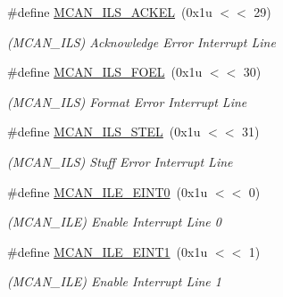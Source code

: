 \begin{DoxyCompactItemize}
\mbox{\label{group__SAME70__MCAN_gacbc1d7720db5dbf6b5d8d7e0f2c975e2}} 
\#define \mbox{\hyperlink{group__SAME70__MCAN_gacbc1d7720db5dbf6b5d8d7e0f2c975e2}{M\+C\+A\+N\+\_\+\+I\+L\+S\+\_\+\+A\+C\+K\+EL}}~(0x1u $<$$<$ 29)
\begin{DoxyCompactList}\small\item\em (M\+C\+A\+N\+\_\+\+I\+LS) Acknowledge Error Interrupt Line \end{DoxyCompactList}\item 
\mbox{\label{group__SAME70__MCAN_ga2ea2130ed2bdb49025f5abcfd2cfa0f0}} 
\#define \mbox{\hyperlink{group__SAME70__MCAN_ga2ea2130ed2bdb49025f5abcfd2cfa0f0}{M\+C\+A\+N\+\_\+\+I\+L\+S\+\_\+\+F\+O\+EL}}~(0x1u $<$$<$ 30)
\begin{DoxyCompactList}\small\item\em (M\+C\+A\+N\+\_\+\+I\+LS) Format Error Interrupt Line \end{DoxyCompactList}\item 
\mbox{\label{group__SAME70__MCAN_ga5734d837234608fcc26e446041609edf}} 
\#define \mbox{\hyperlink{group__SAME70__MCAN_ga5734d837234608fcc26e446041609edf}{M\+C\+A\+N\+\_\+\+I\+L\+S\+\_\+\+S\+T\+EL}}~(0x1u $<$$<$ 31)
\begin{DoxyCompactList}\small\item\em (M\+C\+A\+N\+\_\+\+I\+LS) Stuff Error Interrupt Line \end{DoxyCompactList}\item 
\mbox{\label{group__SAME70__MCAN_ga5195907fff902239550ce690f6e1093f}} 
\#define \mbox{\hyperlink{group__SAME70__MCAN_ga5195907fff902239550ce690f6e1093f}{M\+C\+A\+N\+\_\+\+I\+L\+E\+\_\+\+E\+I\+N\+T0}}~(0x1u $<$$<$ 0)
\begin{DoxyCompactList}\small\item\em (M\+C\+A\+N\+\_\+\+I\+LE) Enable Interrupt Line 0 \end{DoxyCompactList}\item 
\mbox{\label{group__SAME70__MCAN_gaf5d06c668dd58d7e9e3ebd693c53ef66}} 
\#define \mbox{\hyperlink{group__SAME70__MCAN_gaf5d06c668dd58d7e9e3ebd693c53ef66}{M\+C\+A\+N\+\_\+\+I\+L\+E\+\_\+\+E\+I\+N\+T1}}~(0x1u $<$$<$ 1)
\begin{DoxyCompactList}\small\item\em (M\+C\+A\+N\+\_\+\+I\+LE) Enable Interrupt Line 1 \end{DoxyCompactList}\item 
$$
\end{DoxyCompactItemize}
